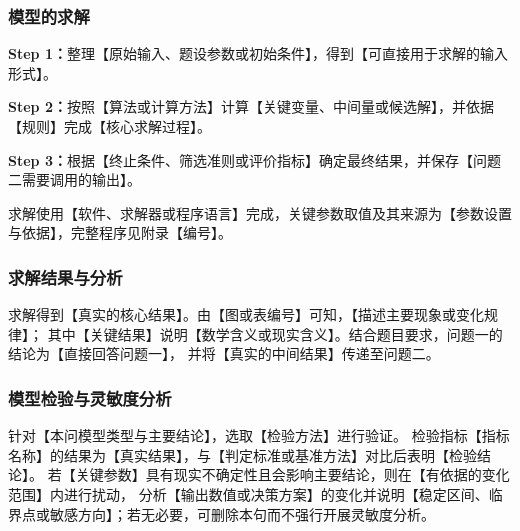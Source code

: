 \subsubsection{模型的求解}

\noindent\textbf{Step 1：}整理【原始输入、题设参数或初始条件】，得到【可直接用于求解的输入形式】。

\noindent\textbf{Step 2：}按照【算法或计算方法】计算【关键变量、中间量或候选解】，并依据【规则】完成【核心求解过程】。

\noindent\textbf{Step 3：}根据【终止条件、筛选准则或评价指标】确定最终结果，并保存【问题二需要调用的输出】。

求解使用【软件、求解器或程序语言】完成，关键参数取值及其来源为【参数设置与依据】，完整程序见附录【编号】。

\subsubsection{求解结果与分析}

求解得到【真实的核心结果】。由【图或表编号】可知，【描述主要现象或变化规律】；
其中【关键结果】说明【数学含义或现实含义】。结合题目要求，问题一的结论为【直接回答问题一】，
并将【真实的中间结果】传递至问题二。

\subsubsection{模型检验与灵敏度分析}

针对【本问模型类型与主要结论】，选取【检验方法】进行验证。
检验指标【指标名称】的结果为【真实结果】，与【判定标准或基准方法】对比后表明【检验结论】。
若【关键参数】具有现实不确定性且会影响主要结论，则在【有依据的变化范围】内进行扰动，
分析【输出数值或决策方案】的变化并说明【稳定区间、临界点或敏感方向】；若无必要，可删除本句而不强行开展灵敏度分析。
